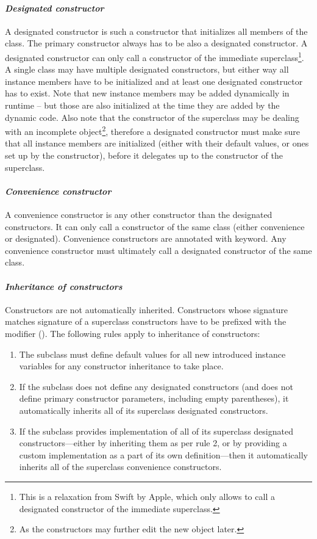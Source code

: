 \paragraph{\em Designated constructor}
A designated constructor is such a constructor that initializes all members of the class. The primary constructor always has to be also a designated constructor. A designated constructor can only call a constructor of the immediate superclass\footnote{This is a relaxation from Swift by Apple, which only allows to call a designated constructor of the immediate superclass.}. A single class may have multiple designated constructors, but either way all instance members have to be initialized and at least one designated constructor has to exist. Note that new instance members may be added dynamically in runtime -- but those are also initialized at the time they are added by the dynamic code. Also note that the constructor of the superclass may be dealing with an incomplete object\footnote{As the constructors may further edit the new object later.}, therefore a designated constructor must make sure that all instance members are initialized (either with their default values, or ones set up by the constructor), before it delegates up to the constructor of the superclass. 

\paragraph{\em Convenience constructor}
A convenience constructor is any other constructor than the designated constructors. It can only call a constructor of the same class (either convenience or designated). Convenience constructors are annotated with  keyword. Any convenience constructor must ultimately call a designated constructor of the same class. 

\paragraph{\em Inheritance of constructors}
Constructors are not automatically inherited. Constructors whose signature matches signature of a superclass constructors have to be prefixed with the  modifier (). The following rules apply to inheritance of constructors:
\begin{enumerate}
  \item[Rule 1] The subclass must define default values for all new introduced instance variables for any constructor inheritance to take place. 
  \item[Rule 2] If the subclass does not define any designated constructors (and does not define primary constructor parameters, including empty parentheses), it automatically inherits all of its superclass designated constructors. 
  \item[Rule 3] If the subclass provides implementation of all of its superclass designated constructors---either by inheriting them as per rule 2, or by providing a custom implementation as a part of its own definition---then it automatically inherits all of the superclass convenience constructors. 
\end{enumerate}

